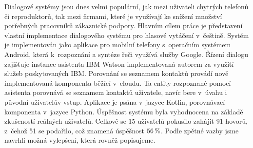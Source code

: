 \documentclass[12pt]{report}
\begin{document}

Dialogové systémy jsou dnes velmi populární, jak mezi uživateli chytrých
telefonů či reproduktorů, tak mezi firmami, které je využívají ke snížení
množství potřebných pracovníků zákaznické podpory.
Hlavním cílem práce je představení vlastní implementace dialogového systému
pro hlasové vytáčení v~češtině. Systém je implementován jako aplikace
pro mobilní telefony s~operačním systémem Android, která k~rozpoznání
a syntéze řeči využívá služby Google. Řízení dialogu zajišťuje instance asistenta
IBM Watson implementovaná autorem za využití služeb poskytovaných IBM.
Porovnání se seznamem kontaktů provádí nově implementovaná komponenta běžící
v~cloudu. Ta entity rozpoznané pomocí asistenta porovnává se seznamem kontaktů
uživatele, navíc bere v~úvahu i původní uživatelův vstup.
Aplikace je psána v~jazyce Kotlin, porovnávací komponenta
v~jazyce Python. Úspěšnost systému byla vyhodnocena
na základě zkušeností reálných uživatelů. Celkově se 15 uživatelů pokusilo
zahájit 91 hovorů, z~čehož 51 se podařilo, což znamená úspěšnost \(56\,\rm \%\).
Podle zpětné vazby jsme navrhli možná vylepšení, která rovněž popisujeme.
\end{document}
